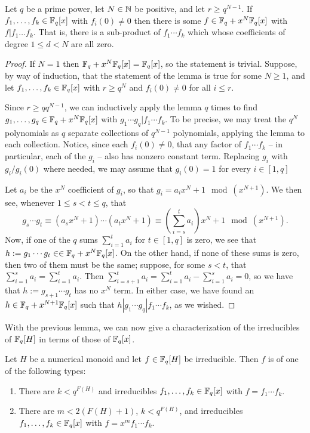 \begin{lemma}\label{lem:coefficient gap boosting}
Let $q$ be a prime power, let $N\in\mathbb{N}$ be positive, and let $r \ge q^{N-1}$.
If $f_1,\dots,f_k\in \mathbb{F}_q[x]$ with $f_i(0)\neq 0$ then there is some $f\in \mathbb{F}_q + x^N \mathbb{F}_q[x]$ with $f | f_1\dots f_k$.
That is, there is a sub-product of $f_1\cdots f_k$ which whose coefficients of degree $1\le d < N$ are all zero.
\end{lemma}

\begin{proof}
If $N=1$ then $\mathbb{F}_q + x^N\mathbb{F}_q[x] = \mathbb{F}_q[x]$, so the statement is trivial.
Suppose, by way of induction, that the statement of the lemma is true for some $N\ge 1$, and let $f_1,\dots, f_k\in \mathbb{F}_q[x]$ with $r \ge q^N$ and $f_i(0)\neq0$ for all $i\le r$.

Since $r \ge q q^{N-1}$, we can inductively apply the lemma $q$ times to find $g_1,\dots,g_q\in \mathbb{F}_q + x^N \mathbb{F}_q[x]$ with $g_1\cdots g_q | f_1\cdots f_k$.
To be precise, we may treat the $q^N$ polynomials as $q$ separate collections of $q^{N-1}$ polynomials, applying the lemma to each collection.
Notice, since each $f_i(0) \neq 0$, that any factor of $f_1\cdots f_k$ -- in particular, each of the $g_i$ -- also has nonzero constant term.
Replacing $g_i$ with $g_i/g_i(0)$ where needed, we may assume that $g_i(0)=1$ for every $i\in [1,q]$

Let $a_i$ be the $x^N$ coefficient of $g_i$, so that $g_i = a_i x^N + 1 \mod (x^{N+1})$.
We then see, whenever $1\le s<t\le q$, that
\[ g_s\cdots g_t \equiv (a_s x^N + 1)\cdots(a_t x^N + 1) \equiv \left(\sum_{i=s}^t a_i\right) x^N + 1 \mod (x^{N+1}). \]
Now, if one of the $q$ sums $\sum_{i=1}^t a_i$ for $t\in [1,q]$ is zero, we see that $h := g_1\cdots g_t\in \in \mathbb{F}_q + x^N\mathbb{F}_q[x]$.
On the other hand, if none of these sums is zero, then two of them must be the same; suppose, for some $s<t$, that $\sum_{i=1}^s a_i = \sum_{i=1}^t a_i$.
Then $\sum_{i=s+1}^ta_i = \sum_{i=1}^t a_i - \sum_{i=1}^s a_i = 0$, so we have that $h := g_{s+1}\cdots g_t$ has no $x^N$ term.
In either case, we have found an $h\in \mathbb{F}_q + x^{N+1}\mathbb{F}_q[x]$ such that $h | g_1\cdots g_q | f_1\cdots f_k$, as we wished.
\end{proof}

With the previous lemma, we can now give a characterization of the irreducibles of $\mathbb{F}_q[H]$ in terms of those of $\mathbb{F}_q[x]$.

\begin{prop}\label{prop:num ring atom classification}
Let $H$ be a numerical monoid and let $f\in \mathbb{F}_q[H]$ be irreducible.
Then $f$ is of one of the following types:
\begin{enumerate}[label=(\rm \arabic{*})]
	\item There are $k< q^{F(H)}$ and irreducibles $f_1,\dots,f_k\in \mathbb{F}_q[x]$ with $f = f_1\cdots f_k$.
	\item There are $m < 2(F(H)+1)$, $k < q^{F(H)}$, and irreducibles $f_1,\dots, f_k\in \mathbb{F}_q[x]$ with $f = x^m f_1\cdots f_k$.
\end{enumerate}
\end{prop}

